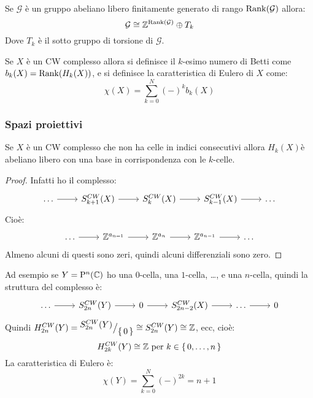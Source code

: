 \begin{theorem}
  Se $ \mathcal{G} $ è un gruppo abeliano libero finitamente generato di rango
  $ \mathrm{Rank}( \mathcal{G} ) $ allora:
  \[
    \mathcal{G} \cong \mathbb{Z}^{\mathrm{Rank}( \mathcal{G} )} \oplus T_k
  \]
  Dove $ T_k $ è il sotto gruppo di torsione di $ \mathcal{G} $.
\end{theorem}

\begin{definition}
  Se $ X $ è un CW complesso allora si definisce il $ k $-esimo
  numero di Betti come $ b_k(X) = \mathrm{Rank}( H_k(X) ) $, e si definisce
  la caratteristica di Eulero di $ X $ come:
  \[
    \chi(X) = \sum_{k=0}^{N} (-)^k b_k(X)
  \]
\end{definition}

\subsubsection{Spazi proiettivi}

\begin{osservation}
  Se $ X $ è un CW complesso che non ha celle in indici consecutivi
  allora $ H_k(X) $è abeliano libero con una base in corrispondenza
  con le $ k $-celle.
\end{osservation}
\begin{proof}
  Infatti ho il complesso:
  \[
    \begin{tikzcd}
      \dots \rar & S^{CW}_{k+1}(X) \rar & S_k^{CW}(X) \rar & S_{k-1}^{CW}(X) \rar & \dots
    \end{tikzcd}
  \]
  Cioè:
  \[
    \begin{tikzcd}
      \dots \rar & \Z^{a_{n=1}} \rar & \Z^{a_n} \rar & \Z^{a_{n-1}} \rar & \dots
    \end{tikzcd}
  \]
  Almeno alcuni di questi sono zeri, quindi alcuni differenziali sono zero.
\end{proof}

Ad esempio se $ Y = \mathrm{P}^n (\mathbb{C}) $ ho una $ 0 $-cella, una $ 1 $-cella, \dots, e una
$ n $-cella, quindi la struttura del complesso è:
\[
  \begin{tikzcd}
    \dots \rar & S^{CW}_{2n}(Y) \rar & 0 \rar & S_{2n - 2}^{CW}(X) \rar & \dots \rar & 0
  \end{tikzcd}
\]
Quindi $ H_{2n}^{CW}(Y) = {^{\textstyle S^{CW}_{2n}(Y)}\big/_{\textstyle \set{0}}} \cong S_{2n}^{CW}(Y) \cong \mathbb{Z} $,
ecc, cioè:
\[
  H_{2k}^{CW}(Y) \cong \mathbb{Z} \text{ per } k \in \set{0, \dots, n}
\]
La caratteristica di Eulero è:
\[
  \chi(Y) = \sum_{k=0}^N (-)^{2k} = n + 1
\]

